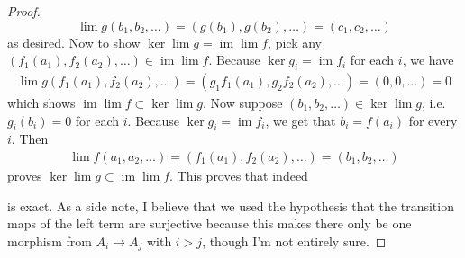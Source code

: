 \documentclass{article}
\DeclareMathOperator{\im}{\mathrm{im}}
\begin{document}
\begin{proof}
    \[
    \lim g(b_1,b_2,\dots)=(g(b_1),g(b_2),\dots)=(c_1,c_2,\dots)
    \]
    as desired. Now to show $\ker \lim g=\im \lim f$, pick any $(f_1(a_1),f_2(a_2),\dots)\in \im \lim f$. Because $\ker g_i=\im f_i$ for each $i$, we have
    \begin{align*}
        \lim g(f_1(a_1),f_2(a_2),\dots)=(g_1f_1(a_1),g_2f_2(a_2),\dots)=(0,0,\dots)=0
    \end{align*}
    which shows $\im \lim f\subset \ker \lim g$. Now suppose $(b_1,b_2,\dots)\in \ker \lim g$, i.e. $g_i(b_i)=0$ for each $i$. Because $\ker g_i=\im f_i$, we get that $b_i=f(a_i)$ for every $i$. Then
    \begin{align*}
        \lim f (a_1,a_2,\dots)=(f_1(a_1),f_2(a_2),\dots)=(b_1,b_2,\dots)
    \end{align*}
    proves $\ker \lim g \subset \im \lim f$. This proves that indeed
    \begin{center}
    \end{center}
    is exact. As a side note, I believe that we used the hypothesis that the transition maps of the left term are surjective because this makes there only be one morphism from $A_i\to A_j$ with $i>j$, though I'm not entirely sure.
\end{proof}
\subsection{}

\section{}
\subsection{}
\end{document}
